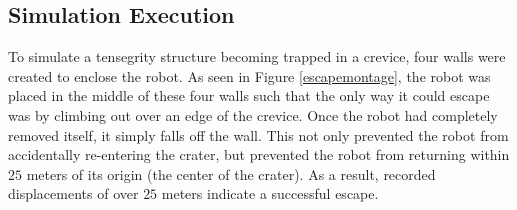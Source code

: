 \documentclass{llncs}
\begin{document}
\subsection{Simulation Execution}
\label{simexec} {
To simulate a tensegrity structure becoming trapped in a crevice, four walls were created to enclose the robot. 
As seen in Figure \ref{escapemontage}, the robot was placed in the middle of these four walls such that the only way it could escape was by climbing out over an edge of the crevice. 
Once the robot had completely removed itself, it simply falls off the wall.
This not only prevented the robot from accidentally re-entering the crater, but prevented the robot from returning within $25$ meters of its origin (the center of the crater).
As a result, recorded displacements of over $25$ meters indicate a successful escape.

}
\end{document}
